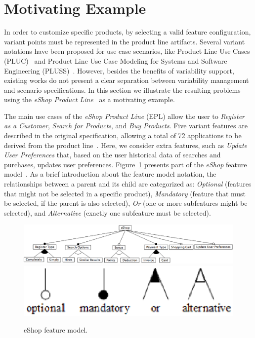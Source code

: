 \documentclass{acm_proc_article-sp}
\begin{document}
\section{Motivating Example}
\label{sec:example}

In order to customize specific products, by selecting a valid feature configuration, variant points must be represented in the 
product line artifacts. Several variant notations have been proposed for use case scenarios, like  Product Line Use Cases (PLUC)~\cite{bertolino-esec-2003} and Product Line Use Case Modeling for Systems and
Software Engineering (PLUSS)~\cite{eriksson-splc-2005}. However, besides
the benefits of variability support, existing works do not present a clear separation between variability 
management and scenario specifications. In this section we illustrate the resulting problems 
using the \emph{eShop Product Line}~\cite{eshop-url} as a motivating example. 

The main use cases of the \emph{eShop Product Line} (EPL) 
allow the user to \emph{Register as a Customer}, \emph{Search for Products}, 
and \emph{Buy Products}.  Five variant features are described in the original specification,
allowing a total  of 72 applications to be derived from the product line~\cite{eshop-url}. Here, 
we consider extra features, such as \emph{Update User Preferences} that, based on the user historical data of searches 
and purchases, updates user preferences. Figure~\ref{fig:eshop-fm} presents part of the \emph{eShop} feature model~\cite{gheyi-alloy-06,czarnecki-book,kang-foda-report}. 
As a brief introduction about the feature model notation, the relationships between a parent and its child are 
categorized as: \emph{Optional} (features that might not be selected in a specific product), \emph{Mandatory} (feature that must be selected, if the parent is also 
selected), \emph{Or} (one or more subfeatures might be selected), and \emph{Alternative} (exactly one subfeature must be selected).     

 \begin{figure}[h]
 \begin{center}
  \includegraphics[scale=0.25]{img/eShop-fm3.eps}
   \includegraphics[scale=0.30]{img/fm-notation.eps}
  \caption{eShop feature model.}
  \label{fig:eshop-fm}
  \end{center}
\end{figure}
\end{document}
